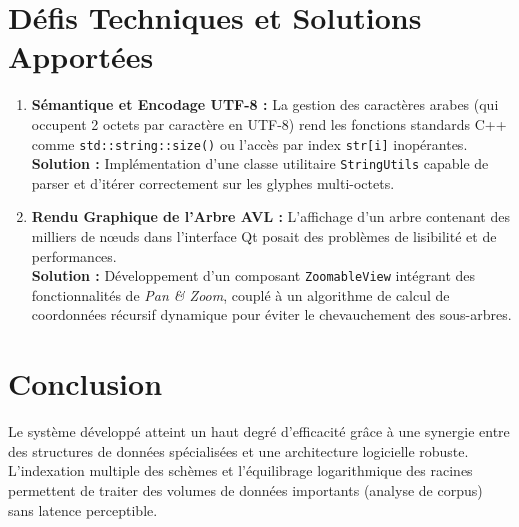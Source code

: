 \documentclass[12pt,a4paper]{article}
\begin{document}
\section{Défis Techniques et Solutions Apportées}
\begin{enumerate}[itemsep=4pt]
	\item \textbf{Sémantique et Encodage UTF-8 :} La gestion des caractères arabes (qui occupent 2 octets par caractère en UTF-8) rend les fonctions standards C++ comme \texttt{std::string::size()} ou l'accès par index \texttt{str[i]} inopérantes. \\
	      \textbf{Solution :} Implémentation d'une classe utilitaire \texttt{StringUtils} capable de parser et d'itérer correctement sur les glyphes multi-octets.
	\item \textbf{Rendu Graphique de l'Arbre AVL :} L'affichage d'un arbre contenant des milliers de nœuds dans l'interface Qt posait des problèmes de lisibilité et de performances. \\
	      \textbf{Solution :} Développement d'un composant \texttt{ZoomableView} intégrant des fonctionnalités de \textit{Pan \& Zoom}, couplé à un algorithme de calcul de coordonnées récursif dynamique pour éviter le chevauchement des sous-arbres.
\end{enumerate}

\section{Conclusion}
Le système développé atteint un haut degré d'efficacité grâce à une synergie entre des structures de données spécialisées et une architecture logicielle robuste. L'indexation multiple des schèmes et l'équilibrage logarithmique des racines permettent de traiter des volumes de données importants (analyse de corpus) sans latence perceptible.
\end{document}
